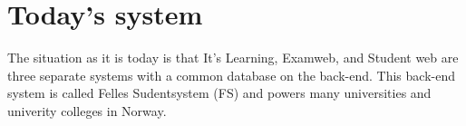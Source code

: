 \section{Today's system}

The situation as it is today is that It's Learning, Examweb, and Student web are three separate systems with a common database on the back-end. 
This back-end system is called Felles Sudentsystem (FS) and powers many universities and univerity colleges in Norway.

%

